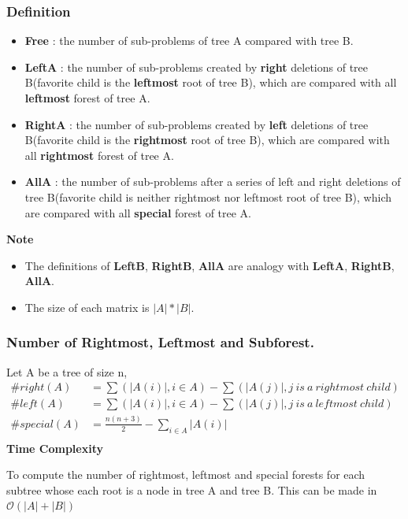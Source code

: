 \documentclass{beamer}
\begin{document}
\begin{frame}
\frametitle{Definition}
\begin{itemize}
\item \textbf{Free} : the number of sub-problems of tree A compared with tree B.
\item \textbf{LeftA} : the number of sub-problems created by \textbf{right} deletions of tree B(favorite child is the \textbf{leftmost} root of tree B), which are compared with all \textbf{leftmost} forest of tree A.
\item \textbf{RightA} : the number of sub-problems created by \textbf{left} deletions of tree B(favorite child is the \textbf{rightmost} root of tree B), which are compared with all \textbf{rightmost} forest of tree A.
\item \textbf{AllA} : the number of sub-problems after a series of left and right deletions of tree B(favorite child is neither rightmost nor leftmost root of tree B), which are compared with all \textbf{special} forest of tree A. 
\end{itemize}

\textbf{Note}
\begin{itemize}
\item The definitions of \textbf{LeftB}, \textbf{RightB}, \textbf{AllA} are analogy with \textbf{LeftA}, \textbf{RightB}, \textbf{AllA}.
\item The size of each matrix is $\left\vert A \right\vert * \left\vert B \right\vert$.
\end{itemize}
\end{frame}

\begin{frame}
\frametitle{Number of Rightmost, Leftmost and Subforest.}
Let A be a tree of size n,
\begin{align*}
\#right(A) &= \sum(\left\vert A(i) \right\vert, i \in A) - \sum(\left\vert A(j) \right\vert, j\ is\ a\ rightmost\ child) \\
\#left(A) &= \sum(\left\vert A(i) \right\vert, i \in A) - \sum(\left\vert A(j) \right\vert, j\ is\ a\ leftmost\ child) \\
\#special(A) &= \frac{n(n+3)}{2} - \sum_{i \in A} \left\vert A(i) \right\vert \\
\end{align*}
\textbf{Time Complexity}

To compute the number of rightmost, leftmost and special forests for each subtree whose each root is a node in tree A and tree B. This can be made in $\mathcal{O}(\left\vert A \right\vert + \left\vert B \right\vert)$
\end{frame}
\end{document}
